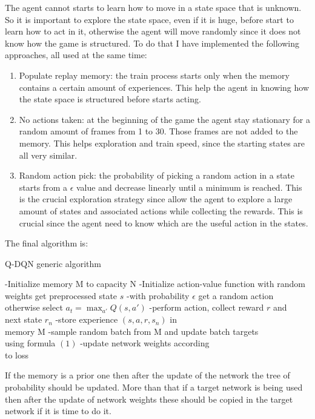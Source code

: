 \documentclass[10pt]{article}
\begin{document}
\begin{multicols}{2}
The agent cannot starts to learn how to move in a state space that is unknown. So it is important to explore the state space, even if it is huge, before start to learn how to act in it, otherwise the agent will move randomly since it does not know how the game is structured. To do that I have implemented the following approaches, all used at the same time:

\begin{enumerate}
\item Populate replay memory: the train process starts only when the memory contains a certain amount of experiences. This help the agent in knowing how the state space is structured before starts acting.

\item No actions taken: at the beginning of the game the agent stay stationary for a random amount of frames from 1 to 30. Those frames are not added to the memory. This helps exploration and train speed, since the starting states are all very similar. 

\item Random action pick: the probability of picking a random action in a state starts from a $\epsilon$ value and decrease linearly until a minimum is reached. This is the crucial exploration strategy since allow the agent to explore a large amount of states and associated actions while collecting the rewards. This is crucial since the agent need to know which are the useful action in the states.
\end{enumerate}
The final algorithm is: 

\begin{algorithm}[H]
\caption{Q-DQN generic algorithm}
\begin{algorithmic} 
\STATE -Initialize memory M to capacity N
\STATE -Initialize action-value function with random weights
\STATE get preprocessed state $s$
\STATE -with probability $\epsilon$ get a random action otherwise select $a_t=\max_{a'} Q(s, a')$ 
\STATE -perform action, collect reward $r$ and \\ next state $r_n$
\STATE -store experience $(s, a, r, s_n)$ in \\ memory M
\STATE -sample random batch from M and
\STATE update batch targets 
\\ using formula $(1)$
\STATE -update network weights according \\ to loss
\ENDIF
\ENDWHILE
\ENDFOR
\end{algorithmic}
\end{algorithm}
If the memory is a prior one then after the update of the network the tree of probability should be updated. More than that if a target network is being used then after the update of network weights these should be copied in the target network if it is time to do it.


\end{multicols}
\end{document}
